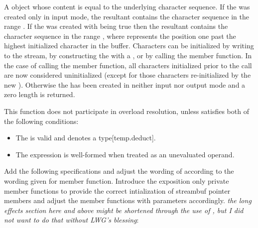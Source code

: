 \documentclass[ebook,11pt,article]{memoir}
\renewcommand{\iref}[1]{[#1]}
\begin{document}
\begin{itemdescr}
\pnum
\returns
A
object whose content is equal to the
underlying character sequence.
If the  was created only in input mode, the resultant
 contains the character sequence in the range
. If the  was created with
 being true then the resultant 
contains the character sequence in the range , where
 represents the position one past the highest initialized character
in the buffer. Characters can be initialized by writing to the stream, by constructing
the  with a , or by calling 
the
 member function. In the case of calling 
the
 member function, all characters initialized prior to
the call are now considered uninitialized (except for those characters re-initialized
by the new ). Otherwise the  has been created
in neither input nor output mode and a zero length  is returned. 

\begin{addedblock}
\pnum %
\constraints 
This function does not participate in overload resolution, unless  satisfies both of the following conditions: 

\begin{itemize}
\item The  
is valid and denotes a type\iref{temp.deduct}.

\item The expression 
is well-formed when treated as an unevaluated operand.
\end{itemize}
\end{addedblock}
\end{itemdescr}

Add the following specifications and adjust the wording of  according to the wording given for  member function. Introduce the exposition only private member functions  to provide the correct intialization of streambuf pointer members and adjust the  member functions with parameters accordingly. \emph{the long effects section here and above might be shortened through the use of , but I did not want to do that without LWG's blessing}:
\end{document}
